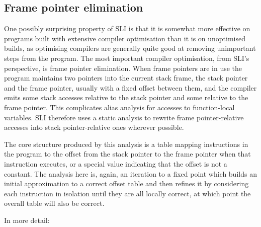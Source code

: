 \subsection{Frame pointer elimination}

One possibly surprising property of SLI is that it is somewhat more
effective on programs built with extensive compiler optimisation than
it is on unoptimised builds, as optimising compilers are generally
quite good at removing unimportant steps from the program.  The most
important compiler optimisation, from SLI's perspective, is frame
pointer elimination.  When frame pointers are in use the program
maintains two pointers into the current stack frame, the stack pointer
and the frame pointer, usually with a fixed offset between them, and
the compiler emits some stack accesses relative to the stack pointer
and some relative to the frame pointer.  This complicates alias
analysis for accesses to function-local variables.  SLI therefore uses
a static analysis to rewrite frame pointer-relative accesses into
stack pointer-relative ones wherever possible.

The core structure produced by this analysis is a table mapping
instructions in the program to the offset from the stack pointer to
the frame pointer when that instruction executes, or a special value
indicating that the offset is not a constant.  The analysis here is,
again, an iteration to a fixed point which builds an initial
approximation to a correct offset table and then refines it by
considering each instruction in isolation until they are all locally
correct, at which point the overall table will also be correct.

In more detail:

